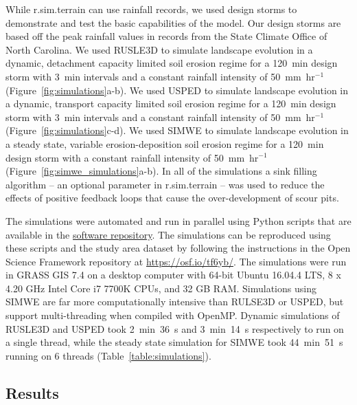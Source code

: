 \documentclass[gmd, manuscript]{copernicus}
\begin{document}
While r.sim.terrain can use rainfall records,
we used design storms to demonstrate and test 
the basic capabilities of the model. 
Our design storms are based off the peak rainfall values
in records from the State Climate Office of North Carolina.
We used RUSLE3D to simulate landscape evolution
in a dynamic, detachment capacity limited soil erosion regime
for a 120~\unit{min} design storm
with 3~\unit{min} intervals 
and a constant rainfall intensity of 50~\unit{mm~hr}$^{-1}$
(Figure~\ref{fig:simulations}a-b).
%
We used USPED to simulate landscape evolution
in a dynamic, transport capacity limited soil erosion regime
for a 120~\unit{min} design storm
with 3~\unit{min} intervals 
and a constant rainfall intensity of 50~\unit{mm~hr}$^{-1}$
(Figure~\ref{fig:simulations}c-d).
%
We used SIMWE to simulate landscape evolution
in a steady state, variable erosion-deposition soil erosion regime
for a 120~\unit{min} design storm
with a constant rainfall intensity of 50~\unit{mm~hr}$^{-1}$
(Figure~\ref{fig:simwe_simulations}a-b). 
%
In all of the simulations 
a sink filling algorithm
-- an optional parameter in r.sim.terrain -- 
was used to reduce the effects of positive feedback loops
that cause the over-development of scour pits. 

The simulations were automated and run in parallel
using Python scripts that are available in the 
\href{https://github.com/baharmon/landscape_evolution}{software repository}.
The simulations can be reproduced using these scripts
and the study area dataset 
by following the instructions 
in the Open Science Framework repository 
at \url{https://osf.io/tf6yb/}.
The simulations were run 
in GRASS GIS 7.4 
on a desktop computer 
with 64-bit Ubuntu 16.04.4 LTS,
8 x 4.20 GHz Intel Core i7 7700K CPUs,
and 32 GB RAM. 
Simulations using SIMWE 
are far more computationally intensive
than RULSE3D or USPED, 
but support multi-threading 
when compiled with OpenMP. 
Dynamic simulations of RUSLE3D and USPED took
2~\unit{min}~36~\unit{s} and 
3~\unit{min}~14~\unit{s} respectively
to run on a single thread, 
while the steady state simulation for SIMWE took 
44~\unit{min}~51~\unit{s} running on 6 threads
(Table~\ref{table:simulations}).

\subsection{Results}

\end{document}
